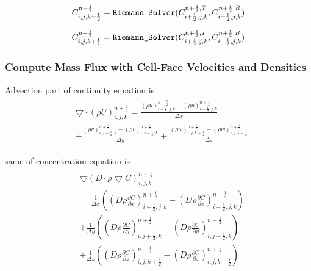 \documentclass{article}
\numberwithin{equation}{subsection}
\begin{document}
\begin{equation}
C^{n+\frac{1}{2}}_{i,j,k-\frac{1}{2}} = \verb|Riemann_Solver|(C^{n+\frac{1}{2},T}_{i+\frac{1}{2},j,k}, C^{n+\frac{1}{2},B}_{i+\frac{1}{2},j,k})
\end{equation}

\begin{equation}
C^{n+\frac{1}{2}}_{i,j,k+\frac{1}{2}} = \verb|Riemann_Solver|(C^{n+\frac{1}{2},T}_{i+\frac{1}{2},j,k}, C^{n+\frac{1}{2},B}_{i+\frac{1}{2},j,k})
\end{equation}




\subsubsection{Compute Mass Flux with Cell-Face Velocities and Densities}
Advection part of continuity equation is
\begin{align}
\begin{split}
& \bigtriangledown \cdot(\rho U)^{n+\frac{1}{2}}_{i,j,k} = \frac{(\rho u)^{n+\frac{1}{2}}_{i+\frac{1}{2},j,k} - (\rho u)^{n+\frac{1}{2}}_{i-\frac{1}{2},j,k}}{\Delta x} \\
& + \frac{(\rho v)^{n+\frac{1}{2}}_{i,j+\frac{1}{2},k} - (\rho v)^{n+\frac{1}{2}}_{i,j-\frac{1}{2},k}}{\Delta y} + \frac{(\rho w)^{n+\frac{1}{2}}_{i,j,k+\frac{1}{2}} - (\rho w)^{n+\frac{1}{2}}_{i,j,k-\frac{1}{2}}}{\Delta z}
\end{split}
\end{align}

same of concentration equation is
\begin{align}
\begin{split}
& \bigtriangledown(D \cdot \rho \bigtriangledown C)^{n+\frac{1}{2}}_{i,j,k} \\ 
& = \frac{1}{\Delta x}((D\rho\frac{\partial C}{\partial x})^{n+\frac{1}{2}}_{i+\frac{1}{2},j,k} - (D\rho\frac{\partial C}{\partial x})^{n+\frac{1}{2}}_{i-\frac{1}{2},j,k}) \\
& + \frac{1}{\Delta y}((D\rho\frac{\partial C}{\partial y})^{n+\frac{1}{2}}_{i,j+\frac{1}{2},k} - (D\rho\frac{\partial C}{\partial y})^{n+\frac{1}{2}}_{i,j-\frac{1}{2},k}) \\
& + \frac{1}{\Delta z}((D\rho\frac{\partial C}{\partial z})^{n+\frac{1}{2}}_{i,j,k+\frac{1}{2}} - (D\rho\frac{\partial C}{\partial z})^{n+\frac{1}{2}}_{i,j,k-\frac{1}{2}})
\end{split}
\end{align}
\end{document}
